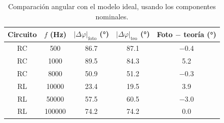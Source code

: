 \begin{table}[htbp]
\centering
\small
\setlength{\tabcolsep}{6pt}
\caption{Comparación angular con el modelo ideal, usando los componentes nominales.}
\label{tab:comparacion}
\begin{tabular}{ccccc}
\toprule
Circuito & $f$ (Hz) & $|\Delta\varphi|_{\mathrm{foto}}$ (°) & $|\Delta\varphi|_{\mathrm{teo}}$ (°) & Foto $-$ teoría (°) \\
\midrule
RC & 500 & \num{86.7} & \num{87.1} & \num{-0.4} \\
RC & 1000 & \num{89.5} & \num{84.3} & \num{5.2} \\
RC & 8000 & \num{50.9} & \num{51.2} & \num{-0.3} \\
RL & 10000 & \num{23.4} & \num{19.5} & \num{3.9} \\
RL & 50000 & \num{57.5} & \num{60.5} & \num{-3.0} \\
RL & 100000 & \num{74.2} & \num{74.2} & \num{0.0} \\
\bottomrule
\end{tabular}
\end{table}
